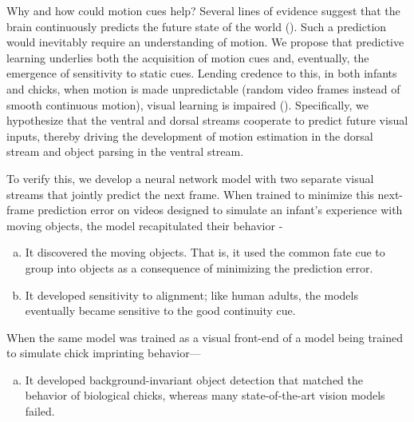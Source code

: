 \documentclass[10pt,letterpaper]{article}
\begin{document}
Why and how could motion cues help? Several lines of evidence suggest that the brain continuously predicts the future state of the world (\cite{rao1999predictive, clark2013whatever, caucheteux_evidence_2023}). Such a prediction would inevitably require an understanding of motion. We propose that predictive learning underlies both the acquisition of motion cues and, eventually, the emergence of sensitivity to static cues. Lending credence to this, in both infants and chicks, when motion is made unpredictable (random video frames instead of smooth continuous motion), visual learning is impaired (\cite{kellman1984perception, wood2018development}). Specifically, we hypothesize that the ventral and dorsal streams cooperate to predict future visual inputs, thereby driving the development of motion estimation in the dorsal stream and object parsing in the ventral stream.

To verify this, we develop a neural network model with two separate visual streams that jointly predict the next frame. When trained to minimize this next-frame prediction error on videos designed to simulate an infant's experience with moving objects, the model recapitulated their behavior -
\begin{enumerate}[a., nolistsep]
    \item It discovered the moving objects. That is, it used the common fate cue to group into objects as a consequence of minimizing the prediction error.
    \item It developed sensitivity to alignment; like human adults, the models eventually became sensitive to the good continuity cue.
\end{enumerate}
When the same model was trained as a visual front-end of a model being trained to simulate chick imprinting behavior—
\begin{enumerate}[a., nolistsep, resume]
    \item It developed background-invariant object detection that matched the behavior of biological chicks, whereas many state-of-the-art vision models failed.
\end{enumerate}
\end{document}
